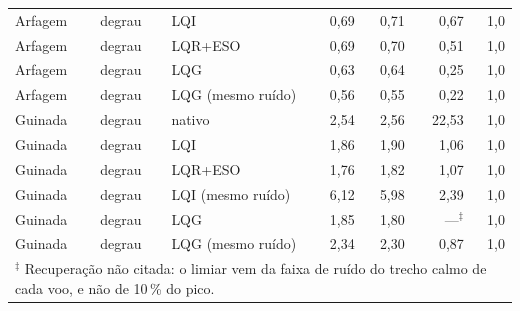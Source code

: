 \begin{tabular}{lllrrrr}
Arfagem & degrau & LQI & 0,69 & 0,71 & 0,67 & 1,0 \\
Arfagem & degrau & LQR+ESO & 0,69 & 0,70 & 0,51 & 1,0 \\
Arfagem & degrau & LQG & 0,63 & 0,64 & 0,25 & 1,0 \\
Arfagem & degrau & LQG (mesmo ruído) & 0,56 & 0,55 & 0,22 & 1,0 \\
Guinada & degrau & nativo & 2,54 & 2,56 & 22,53 & 1,0 \\
Guinada & degrau & LQI & 1,86 & 1,90 & 1,06 & 1,0 \\
Guinada & degrau & LQR+ESO & 1,76 & 1,82 & 1,07 & 1,0 \\
Guinada & degrau & LQI (mesmo ruído) & 6,12 & 5,98 & 2,39 & 1,0 \\
Guinada & degrau & LQG & 1,85 & 1,80 & ---$^\ddagger$ & 1,0 \\
Guinada & degrau & LQG (mesmo ruído) & 2,34 & 2,30 & 0,87 & 1,0 \\
\bottomrule
\multicolumn{7}{l}{\footnotesize $^\ddagger$ Recuperação não citada: o limiar vem da faixa de ruído do trecho calmo de cada voo, e não de 10\,\% do pico.} \\
\end{tabular}
